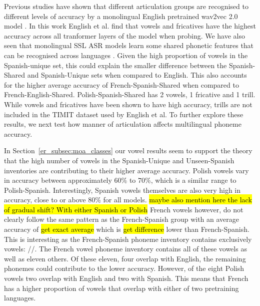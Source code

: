 Previous studies have shown that different articulation groups are recognised to different levels of accuracy by a monolingual English pretrained wav2vec 2.0 model \cite{english2022domain}. In this work English et al. find that vowels and fricatives have the highest accuracy across all tranformer layers of the model when probing. We have also seen that monolingual SSL ASR models learn some shared phonetic features that can be recognised across languages \cite{li2023quantitative}. Given the high proportion of vowels in the Spanish-unique set, this could explain the smaller difference between the Spanish-Shared and Spanish-Unique sets when compared to English. This also accounts for the higher average accuracy of French-Spanish-Shared when compared to French-English-Shared. Polish-Spanish-Shared has 2 vowels, 1 fricative and 1 trill. While vowels and fricatives have been shown to have high accuracy, trills are not included in the TIMIT dataset \cite{timit} used by English et al. To further explore these results, we next test how manner of articulation affects multilingual phoneme accuracy.

In Section~\ref{er_subsec:moa_classes} our vowel results seem to support the theory that the high number of vowels in the Spanish-Unique and Unseen-Spanish inventories are contributing to their higher average accuracy. Polish vowels vary in accuracy between approximately 60\% to 70\%, which is a similar range to Polish-Spanish. Interestingly, Spanish vowels themselves are also very high in accuracy, close to or above 80\% for all models. \hl{maybe also mention here the lack of gradual shift? With either Spanish or Polish} French vowels however, do not clearly follow the same pattern as the French-Spanish group with an average accuracy of \hl{get exact average} which is \hl{get difference} lower than French-Spanish. This is interesting as the French-Spanish phoneme inventory contains exclusively vowels: //. The French vowel phoneme inventory contains all of these vowels as well as eleven others. Of these eleven, four overlap with English, the remaining phonemes could contribute to the lower accuracy. However, of the eight Polish vowels two overlap with English and two with Spanish. This means that French has a higher proportion of vowels that overlap with either of two pretraining languages.

